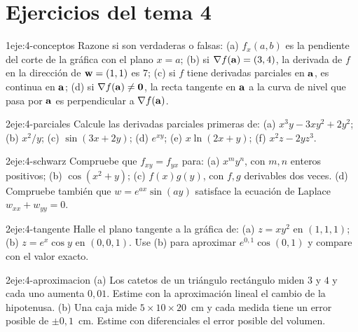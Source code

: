 \section*{Ejercicios del tema 4}

\begin{ejercicio}{1}{eje:4-conceptos}
Razone si son verdaderas o falsas: (a) $f_x(a,b)$ es la pendiente del corte de la gráfica con el plano $x=a$; (b) si $\nabla f(\mathbf{a})=(3,4)$, la derivada de $f$ en la dirección de $\mathbf{w}=(1,1)$ es $7$; (c) si $f$ tiene derivadas parciales en $\mathbf{a}$, es continua en $\mathbf{a}$; (d) si $\nabla f(\mathbf{a})\neq\mathbf{0}$, la recta tangente en $\mathbf{a}$ a la curva de nivel que pasa por $\mathbf{a}$ es perpendicular a $\nabla f(\mathbf{a})$.
\end{ejercicio}

\begin{ejercicio}{2}{eje:4-parciales}
Calcule las derivadas parciales primeras de: (a) $x^3y-3xy^2+2y^2$; (b) $x^2/y$; (c) $\sin(3x+2y)$; (d) $e^{xy}$; (e) $x\ln(2x+y)$; (f) $x^2z-2yz^3$.
\end{ejercicio}

\begin{ejercicio}{2}{eje:4-schwarz}
Compruebe que $f_{xy}=f_{yx}$ para: (a) $x^my^n$, con $m,n$ enteros positivos; (b) $\cos(x^2+y)$; (c) $f(x)g(y)$, con $f,g$ derivables dos veces. (d) Compruebe también que $w=e^{ax}\sin(ay)$ satisface la ecuación de Laplace $w_{xx}+w_{yy}=0$.
\end{ejercicio}

\begin{ejercicio}{2}{eje:4-tangente}
Halle el plano tangente a la gráfica de: (a) $z=xy^2$ en $(1,1,1)$; (b) $z=e^{x}\cos y$ en $(0,0,1)$. Use (b) para aproximar $e^{0{,}1}\cos(0{,}1)$ y compare con el valor exacto.
\end{ejercicio}

\begin{ejercicio}{2}{eje:4-aproximacion}
(a) Los catetos de un triángulo rectángulo miden $3$ y $4$ y cada uno aumenta $0{,}01$. Estime con la aproximación lineal el cambio de la hipotenusa. (b) Una caja mide $5\times10\times20$~cm y cada medida tiene un error posible de $\pm0{,}1$~cm. Estime con diferenciales el error posible del volumen.
\end{ejercicio}

